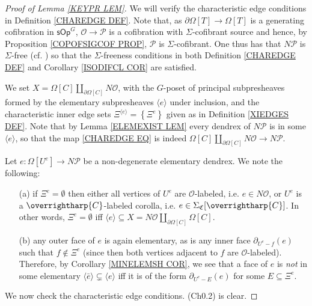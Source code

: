 \documentclass[a4paper,10pt
,draft
]{article}%
\numberwithin{equation}{section}
\numberwithin{figure}{section}
\theoremstyle{definition} %
\newcommand{\vect}[1]{\text{\overrightharp{\ensuremath{#1}}}}
\newcommand{\sOp}{\ensuremath{\mathsf{sOp}}}%
\renewcommand{\O}{\ensuremath{\mathcal O}}
\renewcommand{\P}{\ensuremath{\mathcal P}}
\newcommand{\1}{\ensuremath{\mathbbm 1}}%
\begin{document}
\begin{proof}[Proof of Lemma \ref{KEYPR LEM}]
	We will verify the characteristic edge conditions in Definition \ref{CHAREDGE DEF}.
%
	Note that, 
	as $\partial \Omega[T] \to \Omega[T]$ is a generating cofibration in $\sOp^G$,
	$\O \to \P$ is a cofibration with $\Sigma$-cofibrant source and hence, by Proposition \ref{COPOFSIGCOF PROP},
	$\P$ is $\Sigma$-cofibrant.
	One thus has that 
	$N \mathcal{P}$ is $\Sigma$-free
	(cf. \cite[Lemma 5.9]{BM03})
	so that 
	the $\Sigma$-freeness conditions in 
	both Definition \ref{CHAREDGE DEF}
	and Corollary \ref{ISODIFCL COR}
	are satisfied.

	We set $X = \Omega[C] \amalg_{\partial \Omega[C]} N \mathcal{O}$, 
	with the $G$-poset of principal subpresheaves formed by the 
	elementary subpresheaves 
	$\langle e \rangle$
	under inclusion, and the characteristic inner edge sets
	$\Xi^{\langle e \rangle} = \left\{\Xi^{e}\right\}$ given as in Definition \ref{XIEDGES DEF}.
	Note that by Lemma \ref{ELEMEXIST LEM}
	every dendrex of $N \mathcal{P}$ is in some 
	$\langle e \rangle$, so that the map
	\eqref{CHAREDGE EQ} is indeed
	$\Omega[C] \amalg_{\partial \Omega[C]} N \mathcal{O}
	\to N \mathcal{P}$.
	
	Let $e\colon \Omega[U^e] \to N \mathcal{P}$
	be a non-degenerate elementary dendrex. We note the following: 
	\begin{itemize}
		\item[(a)] if $\Xi^e = \emptyset$ then 
		either all vertices of $U^e$ are $\O$-labeled, i.e. $e \in N \mathcal{O}$, 
		or $U^e$ is a $\vect{C}$-labeled corolla, 
		i.e. $e \in \Sigma_{\mathfrak{C}}[\vect{C}]$.
		In other words, $\Xi^e = \emptyset$ iff 
		$\langle e \rangle \subseteq X = N \mathcal{O} \amalg_{\partial \Omega[C]} \Omega[C]$.
		\item[(b)] any outer face of $e$ is again elementary,
		as is any inner face $\partial_{U^e-f} (e)$ such that $f \not \in \Xi^e$
		(since then both vertices adjacent to $f$ are $\O$-labeled).
		Therefore, by Corollary \ref{MINELEMSH COR},
		we see that a face of $e$ is \emph{not} in
		some elementary $\langle \bar{e} \rangle \subsetneq \langle e \rangle$
		iff it is of the form
		$\partial_{U^e - E} (e)$
		for some $E \subseteq \Xi^e$.
	\end{itemize}

	We now check the characteristic edge conditions. (Ch0.2) is clear.
	

\end{proof}
\end{document}
